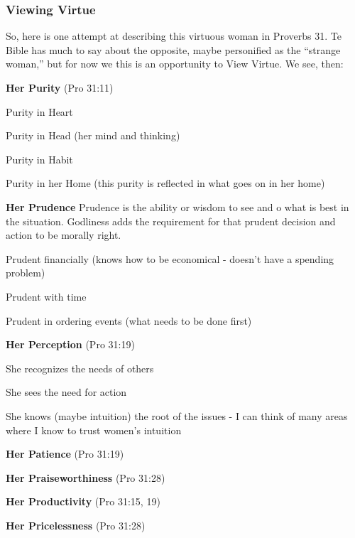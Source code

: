 \subsubsection{Viewing Virtue}
So, here is one attempt at describing this virtuous woman in Proverbs 31. Te Bible has much to say about the opposite, maybe personified as the ``strange woman,'' but for now we this is an opportunity to View Virtue. We see, then:
\begin{compactenum}
    \item \textbf{Her Purity} (Pro 31:11) 
    \begin{compactenum}[A.]
        \item Purity in Heart
        \item Purity in Head (her mind and thinking)
        \item Purity in Habit
        \item Purity in her Home (this purity is reflected in what goes on in her home)
    \end{compactenum}
    \item \textbf{Her Prudence} Prudence is the ability or wisdom to see and o what is best in the situation. Godliness adds the requirement for that prudent decision and action to be morally right.
    \begin{compactenum}[A.]
        \item Prudent financially (knows how to be economical - doesn't have a spending problem)
        \item Prudent with time
        \item Prudent in ordering events (what needs to be done first)
    \end{compactenum}
    \item \textbf{Her Perception}  (Pro 31:19) 
    \begin{compactenum}[A.]
        \item She recognizes the needs of others
        \item She sees the need for action
        \item She knows (maybe intuition) the root of the issues - I can think of many areas where I know to trust women's intuition
    \end{compactenum}
    \item \textbf{Her Patience}  (Pro 31:19) 
    \item \textbf{Her Praiseworthiness}  (Pro 31:28) 
    \item \textbf{Her Productivity}  (Pro 31:15, 19) 
    \item \textbf{Her Pricelessness}  (Pro 31:28)  
\end{compactenum}

